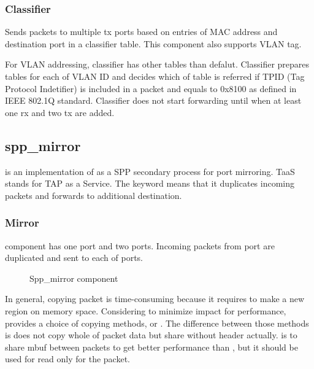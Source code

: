 \documentclass[a4paper,11pt,openany,oneside,english]{sphinxmanual}
\begin{document}
\subsubsection{Classifier}
\label{\detokenize{design/spp_secondary:classifier}}
Sends packets to multiple tx ports based on entries of
MAC address and destination port in a classifier table.
This component also supports VLAN tag.

For VLAN addressing, classifier has other tables than defalut.
Classifier prepares tables for each of VLAN ID and decides
which of table is referred
if TPID (Tag Protocol Indetifier) is included in a packet and
equals to 0x8100 as defined in IEEE 802.1Q standard.
Classifier does not start forwarding until when at least one rx and two tx
are added.


\subsection{spp\_mirror}
\label{\detokenize{design/spp_secondary:spp-mirror}}\label{\detokenize{design/spp_secondary:spp-design-spp-sec-mirror}}
 is an implementation of
as a SPP secondary process for port mirroring.
TaaS stands for TAP as a Service.
The keyword  means that it duplicates incoming packets and forwards
to additional destination.


\subsubsection{Mirror}
\label{\detokenize{design/spp_secondary:mirror}}
 component has one  port and two  ports. Incoming packets
from  port are duplicated and sent to each of  ports.

\begin{figure}[htbp]
\centering
\capstart

\noindent{}
\caption{Spp\_mirror component}\label{\detokenize{design/spp_secondary:id4}}\label{\detokenize{design/spp_secondary:figure-spp-mirror-design}}\end{figure}

In general, copying packet is time-consuming because it requires to make a new
region on memory space. Considering to minimize impact for performance,
 provides a choice of copying methods,  or
.
The difference between those methods is  does not copy whole of
packet data but share without header actually.
 is to share mbuf between packets to get better performance
than , but it should be used for read only for the packet.
\end{document}
